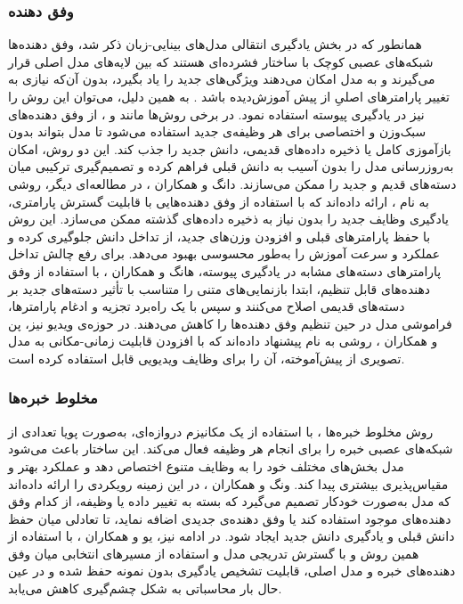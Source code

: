 \subsubsection{وفق دهنده}
همانطور که در بخش یادگیری انتقالی مدل‌های بینایی-زبان ذکر شد، وفق دهنده‌ها شبکه‌های عصبی کوچک با ساختار فشرده‌ای هستند که بین لایه‌های مدل اصلی قرار می‌گیرند و به مدل امکان می‌دهند ویژگی‌های جدید را یاد بگیرد، بدون آن‌که نیازی به تغییر پارامترهای اصلیِ از پیش آموزش‌دیده باشد \cite{llm_continual}. به همین دلیل، می‌توان این روش را نیز در یادگیری پیوسته استفاده نمود. در برخی روش‌ها مانند 
\cite{dia-adapter-2025}
و 
\cite{ease-adapter-2024}،
از وفق دهنده‌های سبک‌وزن و اختصاصی برای هر وظیفه‌ی جدید استفاده می‌شود تا مدل بتواند بدون بازآموزی کامل یا ذخیره داده‌های قدیمی، دانش جدید را جذب کند. این دو روش، امکان به‌روزرسانی مدل را بدون آسیب به دانش قبلی فراهم کرده و تصمیم‌گیری ترکیبی میان دسته‌های قدیم و جدید را ممکن می‌سازند. دانگ و همکاران 
\cite{cada-adapter-2025}،
در مطالعه‌ای دیگر، روشی به نام ، ارائه داده‌اند که با استفاده از وفق دهنده‌هایی با قابلیت گسترش پارامتری، یادگیری وظایف جدید را بدون نیاز به ذخیره داده‌های گذشته ممکن می‌سازد. این روش با حفظ پارامترهای قبلی و افزودن وزن‌های جدید، از تداخل دانش جلوگیری کرده و عملکرد و سرعت آموزش را به‌طور محسوسی بهبود می‌دهد. برای رفع چالش تداخل پارامترهای دسته‌های مشابه در یادگیری پیوسته، هانگ و همکاران 
\cite{rapf-adapter-2024}،
با استفاده از وفق دهنده‌های قابل تنظیم، ابتدا بازنمایی‌های متنی را متناسب با تأثیر دسته‌های جدید بر دسته‌های قدیمی اصلاح می‌کنند و سپس با یک راه‌برد تجزیه و ادغام پارامترها، فراموشی مدل در حین تنظیم وفق دهنده‌ها را کاهش می‌دهند. در حوزه‌ی ویدیو نیز، پن و همکاران 
\cite{st-adapter-2022}،
روشی به نام  پیشنهاد داده‌اند که با افزودن قابلیت زمانی-مکانی به مدل‌ تصویری از پیش‌آموخته، آن را برای وظایف ویدیویی قابل استفاده کرده است. 
 
\subsubsection{مخلوط خبره‌ها}
 روش مخلوط خبره‌ها
،
 با استفاده از یک مکانیزم دروازه‌ای، به‌صورت پویا تعدادی از شبکه‌های عصبی خبره را برای انجام هر وظیفه فعال می‌کند. این ساختار باعث می‌شود مدل بخش‌های مختلف خود را به وظایف متنوع اختصاص دهد و عملکرد بهتر و مقیاس‌پذیری بیشتری پیدا کند. ونگ و همکاران 
\cite{sema-2024}،
در این زمینه رویکردی را ارائه داده‌اند که مدل به‌صورت خودکار تصمیم می‌گیرد که بسته به تغییر داده یا وظیفه، از کدام وفق دهنده‌های موجود استفاده کند یا وفق دهنده‌ی جدیدی اضافه نماید، تا تعادلی میان حفظ دانش قبلی و یادگیری دانش جدید ایجاد شود. در ادامه نیز، یو و همکاران 
\cite{ddas-2024}،
با استفاده از همین روش و با گسترش تدریجی مدل  و استفاده از مسیرهای انتخابی میان وفق دهنده‌های خبره و مدل اصلی، قابلیت تشخیص یادگیری بدون نمونه حفظ شده و در عین حال بار محاسباتی به شکل چشم‌گیری کاهش می‌یابد.

 

 
 
 
 
 
 
 
 
 
 
 
 
 
 
 
 
 
 
 
 
 
 
 
 
 
